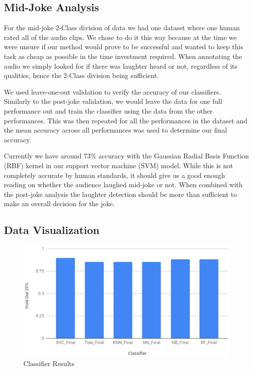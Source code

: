 \documentclass[onecolumn, draftclsnofoot,10pt, compsoc]{IEEEtran}
\begin{document}
\subsection{Mid-Joke Analysis}
For the mid-joke 2-Class division of data we had one dataset where one human rated all of the audio clips. We chose to do it this way because at the time we were unsure if our method would prove to be successful and wanted to keep this task as cheap as possible in the time investment required. When annotating the audio we simply looked for if there was laughter heard or not, regardless of its qualities, hence the 2-Class division being sufficient.\par
\vspace{.3cm}
\noindent We used leave-one-out validation to verify the accuracy of our classifiers. Similarly to the post-joke validation, we would leave the data for one full performance out and train the classifier using the data from the other performances. This was then repeated for all the performances in the dataset and the mean accuracy across all performances was used to determine our final accuracy.\par
\vspace{.3cm}
\noindent Currently we have around 73\% accuracy with the Gaussian Radial Basis Function (RBF) kernel in our support vector machine (SVM) model. While this is not completely accurate by human standards, it should give us a good enough reading on whether the audience laughed mid-joke or not. When combined with the post-joke analysis the laughter detection should be more than sufficient to make an overall decision for the joke.

\clearpage
\subsection{Data Visualization}

\begin{figure}[!h]
\includegraphics[width=\linewidth]{assets/results1.eps}
\caption{Classifier Results}
\end{figure}
\end{document}
